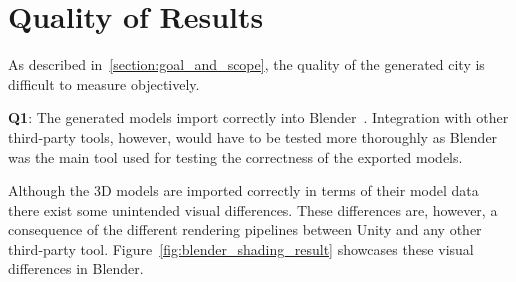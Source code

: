 \section{Quality of Results}

As described in~\ref{section:goal_and_scope}, the quality of the generated city is difficult to measure objectively.

\textbf{Q1}:
The generated models import correctly into Blender~\cite{blender}.
Integration with other third-party tools, however, would have to be tested more thoroughly as Blender was the main tool used for testing the correctness of the exported models.

Although the 3D models are imported correctly in terms of their model data there exist some unintended visual differences.
These differences are, however, a consequence of the different rendering pipelines between Unity and any other third-party tool.
Figure~\ref{fig:blender_shading_result} showcases these visual differences in Blender.

